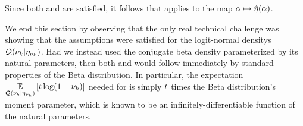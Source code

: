 Since both  and  are satisfied,
it follows that  applies to the map $\alpha \mapsto
\hat\eta(\alpha)$.

We end this section by observing that the only real technical challenge was
showing that the assumptions were satisfied for the logit-normal densitys
$\mathcal{Q}(\nu_{k} \vert \eta_{\nu_{k}})$.  Had we instead used the conjugate beta density
parameterized by its natural parameters, then both  and
 would follow immediately by standard properties of the
Beta distribution.  In particular, the expectation $\underset{\mathcal{Q}(\nu_{k} \vert
\eta_{\nu_{k}})}{\mathbb{E}}\left[t \log (1 - \nu_{k})\right]$ needed for  is simply $t$
times the Beta distribution's moment parameter, which is known to be an
infinitely-differentiable function of the natural parameters.

